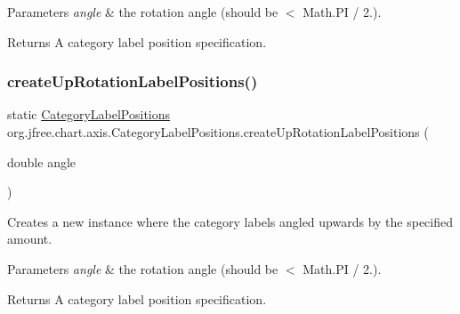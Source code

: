 \begin{DoxyParams}{Parameters}
{\em angle} & the rotation angle (should be $<$ Math.\+PI / 2.).\\
\hline
\end{DoxyParams}
\begin{DoxyReturn}{Returns}
A category label position specification. 
\end{DoxyReturn}
\mbox{\label{classorg_1_1jfree_1_1chart_1_1axis_1_1_category_label_positions_a15845d31a6799d16451089dfac9c9b8b}} 
\subsubsection{\texorpdfstring{create\+Up\+Rotation\+Label\+Positions()}{createUpRotationLabelPositions()}}
{\footnotesize\ttfamily static \mbox{\hyperlink{classorg_1_1jfree_1_1chart_1_1axis_1_1_category_label_positions}{Category\+Label\+Positions}} org.\+jfree.\+chart.\+axis.\+Category\+Label\+Positions.\+create\+Up\+Rotation\+Label\+Positions (\begin{DoxyParamCaption}\item[{double}]{angle }\end{DoxyParamCaption})\hspace{0.3cm}{\ttfamily [static]}}

Creates a new instance where the category labels angled upwards by the specified amount.


\begin{DoxyParams}{Parameters}
{\em angle} & the rotation angle (should be $<$ Math.\+PI / 2.).\\
\hline
\end{DoxyParams}
\begin{DoxyReturn}{Returns}
A category label position specification. 
\end{DoxyReturn}
\mbox{\label{classorg_1_1jfree_1_1chart_1_1axis_1_1_category_label_positions_a464e01f3200acb32fd676e3ee0eb56a5}} 
